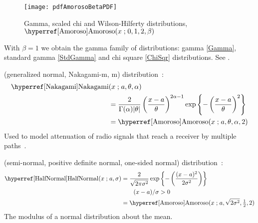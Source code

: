 
\begin{figure}[t]
\begin{center}
\texttt{[image: pdfAmorosoBetaPDF]}
\end{center}
\caption[Gamma, scaled chi and Wilson-Hilferty distributions]{Gamma, scaled chi and Wilson-Hilferty distributions, $\opr{Amoroso}(x\given 0,1,2,\beta)$}
\end{figure}

With $\beta=1$ we obtain the gamma family of distributions: gamma \eqref{Gamma}, standard gamma \eqref{StdGamma} and chi square \eqref{ChiSqr} distributions. See .



 (generalized normal, Nakagami-m, m) distribution~\cite{Nakagami1960}:
\begin{align}
\label{Nakagami}
 \opr{Nakagami}&(x \given a , \theta, \alpha) 
\\ \notag 
& =
 \frac{2}{\Gamma(\alpha) |\theta| }
\left(\frac{x-a }{\theta}\right)^{2\alpha -1}
\exp \left\{
-  \left(\frac{x-a }{\theta}\right)^{2}
\right\}
\checked
\\ \notag
& = \opr{Amoroso}(x\given a,\theta, \alpha ,2) \checked
\notag
\end{align}
Used to model attenuation of radio signals that reach a receiver by multiple paths~\cite{Nakagami1960}.




 (semi-normal, positive definite normal, one-sided normal) distribution~\cite{Johnson1994}:
%
\begin{align}
\label{HalfNormal}
\opr{HalfNormal}(x \given a, \sigma ) 
&= \frac{2}{\sqrt{2\pi \sigma^2}} 
\exp\left\{-\left( \frac{(x-a)^2}{2\sigma^2}\right) \right\}  
\checked
\\
& \qquad (x-a)/\sigma>0 \notag \\
&=  \opr{Amoroso}(x\given  a, \sqrt{2\sigma^2} , \tfrac{1}{2}, 2) \notag  \checked
\end{align}
The modulus of a normal distribution about the mean.

